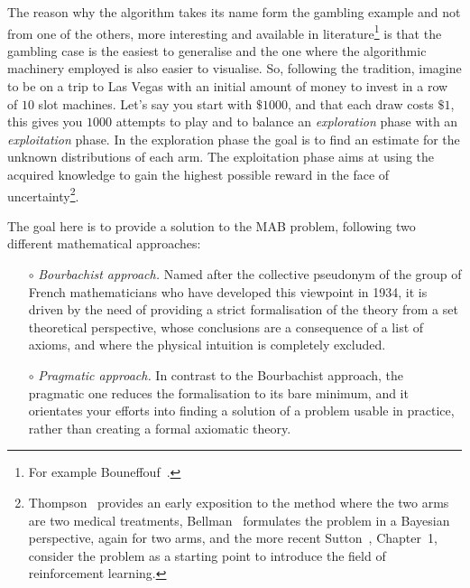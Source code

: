 \documentclass[]{scrartcl}
\theoremstyle{definition}
\begin{document}
The reason why the algorithm takes its name form the gambling example and not from one of the others, more interesting and available in literature\footnote{
    For example Bouneffouf~\cite{bf2019survey}.
    }
is that the gambling case is the easiest to generalise and the one where the algorithmic machinery employed is also easier to visualise.
So, following the tradition, imagine to be on a trip to Las Vegas with an initial amount of money to invest in a row of $10$ slot machines. Let's say you start with $\$1000$, and that each draw costs $\$1$, this gives you $1000$ attempts to play and to balance an \emph{exploration} phase with an \emph{exploitation} phase. In the exploration phase the goal is to find an estimate for the unknown distributions of each arm. The exploitation phase aims at using the acquired knowledge to gain the highest possible reward in the face of uncertainty\footnote{
    Thompson~\cite{thompson1933likelihood} provides an early exposition to the method where the two arms are two medical treatments, Bellman~\cite{bellman1956problem} formulates the problem in a Bayesian perspective, again for two arms, and the more recent Sutton~\cite{sutton2018reinforcement}, Chapter~1, consider the problem as a starting point to introduce the field of reinforcement learning.
}.

The goal here is to provide a solution to the MAB problem, following two different mathematical approaches:
\begin{itemize}
    \item[$\circ$] \emph{Bourbachist approach.} Named after the collective pseudonym of the group of French mathematicians who have developed this viewpoint in 1934, it is driven by the need of providing a strict formalisation of the theory from a set theoretical perspective, whose conclusions are a consequence of a list of   axioms, and where the physical intuition is completely excluded.
    \item[$\circ$] \emph{Pragmatic approach.} In contrast to the Bourbachist approach, the pragmatic one reduces the formalisation to its bare minimum, and it orientates your efforts into finding a solution of a problem usable in practice, rather than creating a formal axiomatic theory.
\end{itemize}
\end{document}
